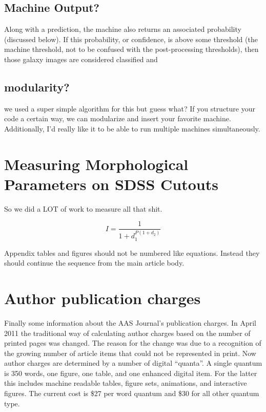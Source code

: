 \documentclass[twocolumn]{aastex6}
\begin{document}
\subsection{Machine Output?}
Along with a prediction, the machine also returns an associated probability (discussed below). If this probability, or confidence, is above some threshold (the machine threshold, not to be confused with the post-processing thresholds), then those galaxy images are considered classified and



\subsection{modularity?}
we used a super simple algorithm for this but guess what? If you structure your code a certain way, we can modularize and insert your favorite machine. Additionally, I'd really like it to be able to run multiple machines simultaneously. 

\appendix

\section{Measuring Morphological Parameters on SDSS Cutouts}

So we did a LOT of work to measure all that shit. 

\begin{equation}
I = \frac{1}{1 + d_{1}^{P (1 + d_{2} )}}
\end{equation}

Appendix tables and figures should not be numbered like equations. Instead
they should continue the sequence from the main article body.

\section{Author publication charges} \label{sec:pubcharge}

Finally some information about the AAS Journal's publication charges.
In April 2011 the traditional way of calculating author charges based on 
the number of printed pages was changed.  The reason for the change
was due to a recognition of the growing number of article items that could not 
be represented in print. Now author charges are determined by a number of
digital ``quanta''.  A single quantum is 350 words, one figure, one table,
and one enhanced digital item.  For the latter this includes machine readable
tables, figure sets, animations, and interactive figures.  The current cost
is \$27 per word quantum and \$30 for all other quantum type.
\end{document}
